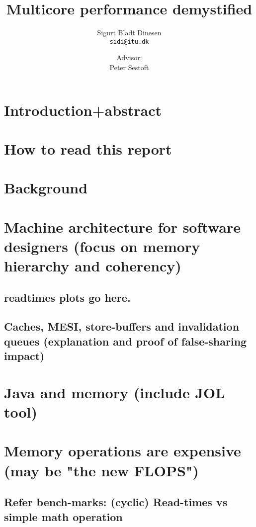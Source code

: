 \documentclass[a4paper, titlepage]{article}
\renewcommand{\%}{\scalebox{.9}{\oldpct}}
\begin{document}
\title{Multicore performance demystified}
\author{
	Sigurt Bladt Dinesen
	\\\texttt{sidi@itu.dk}
	\and
	Advisor:
	\\Peter Sestoft
}

\maketitle
\tableofcontents
\clearpage

\section{Introduction+abstract}
\section{How to read this report}
\section{Background}

\section{Machine architecture for software designers (focus on memory hierarchy and coherency)}
\subsection{readtimes plots go here.}
\subsection{Caches, MESI, store-buffers and invalidation queues (explanation and proof of false-sharing impact)}

\section{Java and memory (include JOL tool)}

\section{Memory operations are expensive (may be "the new FLOPS")}
\subsection{Refer bench-marks: (cyclic) Read-times vs simple math operation}
\end{document}
